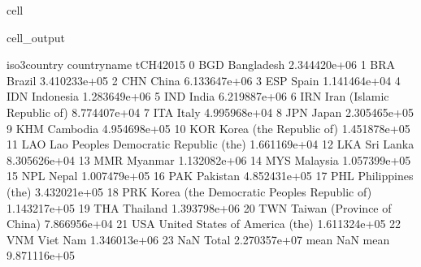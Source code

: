 \documentclass[letterpaper,10pt,english]{jupyterBook}
\begin{document}
\begin{sphinxuseclass}{cell}
\begin{sphinxVerbatimOutput}
\begin{sphinxuseclass}{cell_output}
\begin{sphinxVerbatim}[commandchars=\\\{\}]
     iso3\PYGZus{}country                                 country\PYGZus{}name     tCH4\PYGZus{}2015  \PYGZbs{}
0             BGD                                   Bangladesh  2.344420e+06   
1             BRA                                       Brazil  3.410233e+05   
2             CHN                                        China  6.133647e+06   
3             ESP                                        Spain  1.141464e+04   
4             IDN                                    Indonesia  1.283649e+06   
5             IND                                        India  6.219887e+06   
6             IRN                   Iran (Islamic Republic of)  8.774407e+04   
7             ITA                                        Italy  4.995968e+04   
8             JPN                                        Japan  2.305465e+05   
9             KHM                                     Cambodia  4.954698e+05   
10            KOR                      Korea (the Republic of)  1.451878e+05   
11            LAO       Lao People\PYGZsq{}s Democratic Republic (the)  1.661169e+04   
12            LKA                                    Sri Lanka  8.305626e+04   
13            MMR                                      Myanmar  1.132082e+06   
14            MYS                                     Malaysia  1.057399e+05   
15            NPL                                        Nepal  1.007479e+05   
16            PAK                                     Pakistan  4.852431e+05   
17            PHL                            Philippines (the)  3.432021e+05   
18            PRK  Korea (the Democratic People\PYGZsq{}s Republic of)  1.143217e+05   
19            THA                                     Thailand  1.393798e+06   
20            TWN                   Taiwan (Province of China)  7.866956e+04   
21            USA               United States of America (the)  1.611324e+05   
22            VNM                                     Viet Nam  1.346013e+06   
23            NaN                                        Total  2.270357e+07   
mean          NaN                                         mean  9.871116e+05   


\end{sphinxVerbatim}
\end{sphinxuseclass}
\end{sphinxVerbatimOutput}
\end{sphinxuseclass}
\end{document}
